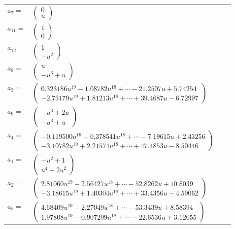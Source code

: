 \documentclass[1p]{elsarticle_modified}
\theoremstyle{definition}
\begin{document}
\begin{tabular}{m{7pt} m{180pt} m{7pt} m{180pt} }
\flushright $a_{7}=$&$\begin{pmatrix}0\\u\end{pmatrix}$ \\
\flushright $a_{11}=$&$\begin{pmatrix}1\\0\end{pmatrix}$ \\
\flushright $a_{12}=$&$\begin{pmatrix}1\\- u^2\end{pmatrix}$ \\
\flushright $a_{8}=$&$\begin{pmatrix}u\\- u^3+u\end{pmatrix}$ \\
\flushright $a_{3}=$&$\begin{pmatrix}0.323186 u^{19}-1.08782 u^{18}+\cdots-21.2507 u+5.74254\\-2.73179 u^{19}+1.81213 u^{18}+\cdots+39.4687 u-6.72997\end{pmatrix}$ \\
\flushright $a_{9}=$&$\begin{pmatrix}- u^3+2 u\\- u^3+u\end{pmatrix}$ \\
\flushright $a_{4}=$&$\begin{pmatrix}-0.119500 u^{19}-0.378541 u^{18}+\cdots-7.19615 u+2.43256\\-3.10782 u^{19}+2.21574 u^{18}+\cdots+47.4853 u-8.50446\end{pmatrix}$ \\
\flushright $a_{1}=$&$\begin{pmatrix}- u^2+1\\u^4-2 u^2\end{pmatrix}$ \\
\flushright $a_{2}=$&$\begin{pmatrix}2.81060 u^{19}-2.56427 u^{18}+\cdots-52.8262 u+10.8039\\-3.18615 u^{19}+1.40304 u^{18}+\cdots+33.4356 u-4.59062\end{pmatrix}$ \\
\flushright $a_{5}=$&$\begin{pmatrix}4.68409 u^{19}-2.27049 u^{18}+\cdots-53.3439 u+8.58394\\1.97808 u^{19}-0.907299 u^{18}+\cdots-22.6536 u+3.12055\end{pmatrix}$ \\

\end{tabular}
\end{document}
